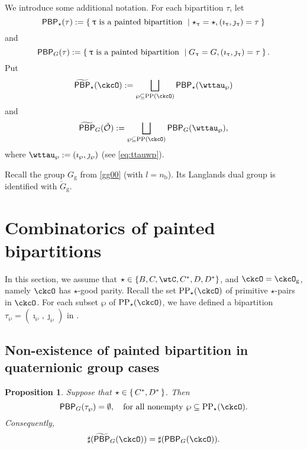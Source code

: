 \documentclass[12pt,a4paper]{amsart}
\def\subset{\subseteq}
\newcommand{\CO}{{\mathcal {O}}}
\numberwithin{equation}{section}
\newtheorem{prop}[thm]{Proposition}
\theoremstyle{remark}
\def\LC{{}^{\scriptscriptstyle L}\sC}
\def\CPP{\mathrm{PP}}
\def\CPPs{\mathrm{PP}_{\star}}
\def\tPBP{\widetilde{\mathsf{PBP}}}
\def\PBP{\mathsf{PBP}}
\def\ckcOg{\ckcO_{\mathrm g}}
\def\nnb{n_{\mathrm b}}
\def\tPBP{\widetilde{\mathsf{PBP}}}
\begin{document}
 
 We introduce some additional notation. For each bipartition $\tau$, let
\[
  \PBP_{\star}(\tau) := \Set{ \uptau \text{ is a painted bipartition }\mid  \star_{\uptau}=\star, (\imath_{\uptau},\jmath_{\uptau}) = \tau}
\]
and
\[
  \PBP_{G}(\tau) := \Set{\uptau \text{ is a painted bipartition }\mid G_{\uptau}=G, (\imath_{\uptau},\jmath_{\uptau}) = \tau}.
\]
Put
\[
  \tPBP_{\star}(\ckcO) := %
  \bigsqcup_{\wp \subseteq \CPP(\ckcO)}\PBP_{\star}(\wttau_{\wp})
\]
and
\[
  \tPBP_{G}(\check \CO):=   \bigsqcup_{\wp \subseteq \CPP(\ckcO)}\PBP_{G}(\wttau_{\wp}),
 \] 
where $\wttau_{\wp} := (\imath_{\wp},\jmath_{\wp})$ (see \eqref{eq:ttauwp}). 


Recall the group $G_\mathrm g$ from \eqref{gg00} (with $l=\nnb$).  Its Langlands dual group is identified with $\check G_\mathrm g$. 




\section{Combinatorics of painted bipartitions}


In this section, we assume that $\star \in \{B,C,\wtC,C^{*},D,D^{*}\}$, and $\ckcO = \ckcOg$, namely $\ckcO $ has $\star$-good parity.
Recall the set  $\CPPs(\ckcO)$ of primitive $\star$-pairs in $\ckcO$. For each subset $\wp$ of $\CPPs(\ckcO)$, we have defined a bipartition $\tau_{\wp}=(\imath_{\wp},\jmath_{\wp})$ in .



%
\subsection{Non-existence of painted bipartition in quaternionic group cases}
\begin{prop} \label{prop:PBP1} Suppose that $\star\in \set{C^{*}, D^{*}}$. Then
\[
    \PBP_{G}(\tau_{\wp}) = \emptyset, \quad \text{for all nonempty $\wp\subset \CPPs(\ckcO)$.}
  \]
 Consequently,
     \[
     \sharp(\tPBP_{G}(\ckcO)) = \sharp(\PBP_{G}(\ckcO)).
  \]
\end{prop}
\end{document}
